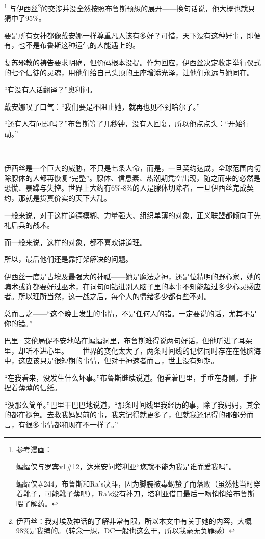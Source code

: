 \documentclass[../main]{subfiles}
\begin{document}
\footnote[1]{参考漫画：

    蝙蝠侠与罗宾v1\#12，达米安问塔利亚“您就不能为我是谁而爱我吗”。

    蝙蝠侠\#244，布鲁斯和Ra's决斗，因为脚腕被毒蝎蛰了而落败（虽然他当时穿着靴子，可能靴子薄吧），Ra's没有补刀，塔利亚借口最后一吻悄悄给布鲁斯喂了解药。}
与伊西丝\footnote[2]{伊西丝：我对埃及神话的了解非常有限，所以本文中有关于她的内容，大概98\%是我编的。（转念一想，DC一般也这么干，所以我毫无负罪感）}的交涉并没全然按照布鲁斯预想的展开——换句话说，他大概也就只猜中了95\%。

要是所有女神都像戴安娜一样尊重凡人该有多好？可惜，天下没有这种好事，即便有，也不是布鲁斯这种运气的人能遇上的。

复苏邪教的祷告要求明确，但价码根本没提。作为回应，伊西丝决定收走举行仪式的七个信徒的灵魂，用他们给自己头顶的王座增添光泽，让他们永远与她同在。

“有没有人话翻译？”奥利问。

戴安娜叹了口气：“我们要是不阻止她，就再也见不到哈尔了。”

“还有人有问题吗？”布鲁斯等了几秒钟，没有人回复，所以他点点头：“开始行动。”

~\

伊西丝是一个巨大的威胁，不只是七条人命，而是，一旦契约达成，全球范围内切除腺体的人都再恢复“完整”。腺体、信息素、热潮期凭空出现，随之而来的必然是恐慌、暴躁与失控。世界上大约有6\%-8\%的人是腺体切除者，一旦伊西丝完成契约，那就是货真价实的天下大乱。

一般来说，对于这样道德模糊、力量强大、组织单薄的对象，正义联盟都倾向于先礼后兵的战术。

而一般来说，这样的对象，都不喜欢讲道理。

所以，最后他们还是靠打架解决的问题。

伊西丝一度是古埃及最强大的神祗——她是魔法之神，还是位精明的野心家，她的骗术或许都要好过巫术，在词句间钻进别人脑子里的本事不知能超过多少心灵感应者。所以理所当然，这一战之后，每个人的情绪多少都有些不对。

总而言之——“这个晚上发生的事情，不是任何人的错。一定要说的话，尤其不是你的错。”

巴里·艾伦局促不安地站在蝙蝠洞里，布鲁斯难得说两句好话，但他听进了耳朵里，却听不进心里。——世界的变化太大了，两条时间线的记忆同时存在在他脑海中，这应该只是很短期的事情，但对于神速者而言，世上没有短期。

“在我看来，没发生什么坏事。”布鲁斯继续说道。他看着巴里，手垂在身侧，手指捏着薄薄的信纸。

“没那么简单。”巴里干巴巴地说道，“那条时间线里我经历的事，除了我妈妈，其余的都在褪色。去救我妈妈前的事，我忘记得就更多了，但就我还记得的那部分而言，有很多事情都和现在不一样了。”
\end{document}
